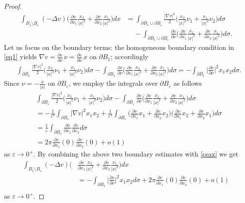 \documentclass[reqno,11pt]{amsart}
\theoremstyle{definition}
\numberwithin{equation}{section}
\newcommand{\e}{\varepsilon}
\renewcommand{\(}{\left(}
\renewcommand{\)}{\right)}
\renewcommand{\[}{\left[}
\renewcommand{\]}{\right]}
\newcommand{\beq}{\begin{equation}}
\newcommand{\eeq}{\end{equation}}
\begin{document}
{\begin{proof}
\beq\label{csax}\begin{aligned}\int_{B_1\setminus B_\e} (-\Delta v)\bigg(\frac{\partial v}{\partial x_1}\frac{x_2}{|x|^2}+\frac{\partial v}{\partial x_2}\frac{x_1}{|x|^2}\bigg)dx&=
 \int_{\partial B_1\cup\partial B_\e} \frac{|\nabla v|^2}{2} \bigg(\frac{x_2}{|x|^2}\nu_1+\frac{x_1}{|x|^2}\nu_2\bigg) d\sigma
\\ &\;\;\;\;-\int_{\partial B_1\cup\partial B_\e }\frac{\partial v}{\partial \nu}\bigg(\frac{\partial v}{\partial x_1}\frac{x_2}{|x|^2}+\frac{\partial v}{\partial x_2}\frac{x_1}{|x|^2}\bigg)d\sigma .
\end{aligned}\eeq
Let us focus on  the boundary terms:
the homogeneous boundary condition in \eqref{eq1} yields  $\nabla v=\frac{\partial v}{\partial \nu}\,\nu=\frac{\partial v}{\partial \nu}\,x $ on $\partial B_1$; accordingly $$\begin{aligned}& \int_{\partial B_1} \frac{|\nabla v|^2}{2} \bigg(\frac{x_2}{|x|^2}\nu_1+\frac{x_1}{|x|^2}\nu_2\bigg) d\sigma-\int_{\partial B_1}\frac{\partial v}{\partial \nu}\bigg(\frac{\partial v}{\partial x_1}\frac{x_2}{|x|^2}+\frac{\partial v}{\partial x_2}\frac{x_1}{|x|^2}\bigg)d\sigma
=-\int_{\partial B_1}\bigg|\frac{\partial v}{\partial \nu}\bigg|^2 x_1x_2d\sigma.
\end{aligned}$$
Since $\nu=-\frac{x}{|x|}$ on $\partial B_\e$, we employ the integrals over $\partial B_\e$ as follows 
 $$\begin{aligned}& \int_{\partial B_\e} \frac{|\nabla v|^2}{2} \bigg(\frac{x_2}{|x|^2}\nu_1+\frac{x_1}{|x|^2}\nu_2\bigg) d\sigma-\int_{\partial B_\e}\frac{\partial v}{\partial \nu}\bigg(\frac{\partial v}{\partial x_1}\frac{x_2}{|x|^2}+\frac{\partial v}{\partial x_2}\frac{x_1}{|x|^2}\bigg)d\sigma
 \\ &=-\frac{1}{\e^{3}} \int_{\partial B_\e} |\nabla v|^2 x_1x_2 +\frac{1}{\e^{3}} \int_{\partial B_\e} \bigg(\frac{\partial v}{\partial x_1}x_1+\frac{\partial v}{\partial x_2}x_2\bigg)\bigg(\frac{\partial v}{\partial x_1}x_2+\frac{\partial v}{\partial x_2}x_1\bigg)d\sigma
 \\ &
=
\frac{1}{\e}\int_{\partial B_\e}\frac{\partial v}{\partial x_1}\frac{\partial v}{\partial x_2}d\sigma
\\ &= 2\pi\frac{\partial v}{\partial x_1}(0)\frac{\partial v}{\partial x_2}(0)+o(1)
  \end{aligned}$$ as $\e\to 0^+$.
 By combining the above two boundary estimates with \eqref{csax} we get
\beq\label{csa1x}\begin{aligned}\int_{B_1\setminus B_\e} (-\Delta v)\bigg(&\frac{\partial v}{\partial x_1}\frac{x_2}{|x|^2}+\frac{\partial v}{\partial x_2}\frac{x_1}{|x|^2}\bigg)dx\\ &=
-\int_{\partial B_1} \bigg|\frac{\partial  v}{\partial \nu}\bigg|^2 x_1x_2 d\sigma+ 2\pi\frac{\partial v}{\partial x_1}(0)\frac{\partial v}{\partial x_2}(0)+o(1)\\ &\;\;\;\;
\end{aligned}\eeq as $\e\to 0^+$. 




\end{proof}}
\end{document}
